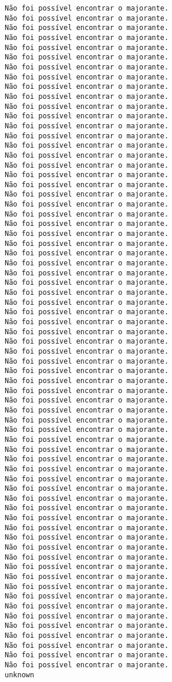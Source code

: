 \documentclass[11pt]{article}
\begin{document}
\begin{Verbatim}[commandchars=\\\{\}]
Não foi possível encontrar o majorante.
Não foi possível encontrar o majorante.
Não foi possível encontrar o majorante.
Não foi possível encontrar o majorante.
Não foi possível encontrar o majorante.
Não foi possível encontrar o majorante.
Não foi possível encontrar o majorante.
Não foi possível encontrar o majorante.
Não foi possível encontrar o majorante.
Não foi possível encontrar o majorante.
Não foi possível encontrar o majorante.
Não foi possível encontrar o majorante.
Não foi possível encontrar o majorante.
Não foi possível encontrar o majorante.
Não foi possível encontrar o majorante.
Não foi possível encontrar o majorante.
Não foi possível encontrar o majorante.
Não foi possível encontrar o majorante.
Não foi possível encontrar o majorante.
Não foi possível encontrar o majorante.
Não foi possível encontrar o majorante.
Não foi possível encontrar o majorante.
Não foi possível encontrar o majorante.
Não foi possível encontrar o majorante.
Não foi possível encontrar o majorante.
Não foi possível encontrar o majorante.
Não foi possível encontrar o majorante.
Não foi possível encontrar o majorante.
Não foi possível encontrar o majorante.
Não foi possível encontrar o majorante.
Não foi possível encontrar o majorante.
Não foi possível encontrar o majorante.
Não foi possível encontrar o majorante.
Não foi possível encontrar o majorante.
Não foi possível encontrar o majorante.
Não foi possível encontrar o majorante.
Não foi possível encontrar o majorante.
Não foi possível encontrar o majorante.
Não foi possível encontrar o majorante.
Não foi possível encontrar o majorante.
Não foi possível encontrar o majorante.
Não foi possível encontrar o majorante.
Não foi possível encontrar o majorante.
Não foi possível encontrar o majorante.
Não foi possível encontrar o majorante.
Não foi possível encontrar o majorante.
Não foi possível encontrar o majorante.
Não foi possível encontrar o majorante.
Não foi possível encontrar o majorante.
Não foi possível encontrar o majorante.
Não foi possível encontrar o majorante.
Não foi possível encontrar o majorante.
Não foi possível encontrar o majorante.
Não foi possível encontrar o majorante.
Não foi possível encontrar o majorante.
Não foi possível encontrar o majorante.
Não foi possível encontrar o majorante.
Não foi possível encontrar o majorante.
Não foi possível encontrar o majorante.
Não foi possível encontrar o majorante.
Não foi possível encontrar o majorante.
Não foi possível encontrar o majorante.
Não foi possível encontrar o majorante.
Não foi possível encontrar o majorante.
Não foi possível encontrar o majorante.
Não foi possível encontrar o majorante.
Não foi possível encontrar o majorante.
Não foi possível encontrar o majorante.
unknown
    \end{Verbatim}
\end{document}

